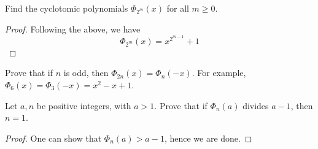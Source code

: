 \documentclass[openany]{book}
\begin{document}
\begin{prob}
Find the cyclotomic polynomials $\Phi_{2^m}(x)$ for all $m \geq 0$.
\end{prob}
\begin{proof}
    Following the above, we have 
    \begin{equation*}
        \Phi_{2^m}(x)=x^{2^{m-1}}+1
    \end{equation*}
\end{proof}



\begin{prop}
Prove that if $n$ is odd, then $\Phi_{2n}(x) = \Phi_n(-x)$. For example, $\Phi_6(x)=\Phi_3(-x)=x^2-x+1$.
\end{prop}


\begin{prob}
Let $a, n$ be positive integers, with $a > 1$. Prove that if $\Phi_n(a)$ divides $a - 1$, then $n = 1$.
\end{prob}
\begin{proof}
    One can show that $\Phi_n(a)>a-1$, hence we are done.
\end{proof}


\end{document}
